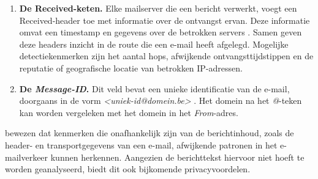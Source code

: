 \begin{enumerate}
    \item \textbf{De Received-keten.} Elke mailserver die een bericht verwerkt, voegt een Received-header toe met informatie over de ontvangst ervan. Deze informatie omvat een timestamp en gegevens over de betrokken servers \autocite{Resnick2008}. Samen geven deze headers inzicht in de route die een e-mail heeft afgelegd. Mogelijke detectiekenmerken zijn het aantal hops, afwijkende ontvangsttijdstippen en de reputatie of geografische locatie van betrokken IP-adressen.
    \item \textbf{De \emph{Message-ID}.} Dit veld bevat een unieke identificatie van de e-mail, doorgaans in de vorm \emph{<uniek-id@domein.be>} \autocite{Resnick2008}. Het domein na het \emph{@}-teken kan worden vergeleken met het domein in het \emph{From}-adres.
\end{enumerate}

\textcite{Gascon2018} bewezen dat kenmerken die onafhankelijk zijn van de berichtinhoud, zoals de header- en transportgegevens van een e-mail, afwijkende patronen in het e-mailverkeer kunnen herkennen. Aangezien de berichttekst hiervoor niet hoeft te worden geanalyseerd, biedt dit ook bijkomende privacyvoordelen.

